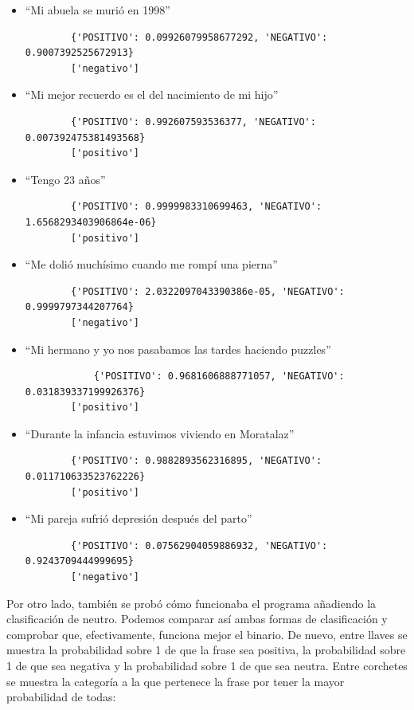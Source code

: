\begin{itemize}
	\item ``Mi abuela se murió en 1998''
	\begin{verbatim}
		{'POSITIVO': 0.09926079958677292, 'NEGATIVO': 0.9007392525672913}
		['negativo']
	\end{verbatim}
	\item ``Mi mejor recuerdo es el del nacimiento de mi hijo''
	\begin{verbatim}
		{'POSITIVO': 0.992607593536377, 'NEGATIVO': 0.007392475381493568}
		['positivo']
	\end{verbatim}
	\item ``Tengo 23 años''
	\begin{verbatim}
		{'POSITIVO': 0.9999983310699463, 'NEGATIVO': 1.6568293403906864e-06}
		['positivo']
	\end{verbatim}
	\item ``Me dolió muchísimo cuando me rompí una pierna''
	\begin{verbatim}
		{'POSITIVO': 2.0322097043390386e-05, 'NEGATIVO': 0.9999797344207764}
		['negativo']
	\end{verbatim}
	\item ``Mi hermano y yo nos pasabamos las tardes haciendo puzzles''
	\begin{verbatim}
			{'POSITIVO': 0.9681606888771057, 'NEGATIVO': 0.031839337199926376}
		['positivo']
	\end{verbatim}
	\item ``Durante la infancia estuvimos viviendo en Moratalaz''
	\begin{verbatim}
		{'POSITIVO': 0.9882893562316895, 'NEGATIVO': 0.011710633523762226}
		['positivo']
	\end{verbatim}
	\item ``Mi pareja sufrió depresión después del parto''
	\begin{verbatim}
		{'POSITIVO': 0.07562904059886932, 'NEGATIVO': 0.9243709444999695}
		['negativo']
	\end{verbatim}

\end{itemize}

Por otro lado, también se probó cómo funcionaba el programa añadiendo la clasificación de neutro. Podemos comparar así ambas formas de clasificación y comprobar que, efectivamente, funciona mejor el binario. De nuevo, entre llaves se muestra la probabilidad sobre 1 de que la frase sea positiva, la probabilidad sobre 1 de que sea negativa y la probabilidad sobre 1 de que sea neutra. Entre corchetes se muestra la categoría a la que pertenece la frase por tener la mayor probabilidad de todas:

